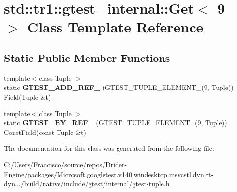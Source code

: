 \hypertarget{classstd_1_1tr1_1_1gtest__internal_1_1_get_3_019_01_4}{}\section{std\+:\+:tr1\+:\+:gtest\+\_\+internal\+:\+:Get$<$ 9 $>$ Class Template Reference}
\label{classstd_1_1tr1_1_1gtest__internal_1_1_get_3_019_01_4}
\subsection*{Static Public Member Functions}
\begin{DoxyCompactItemize}
\item 
\mbox{\label{classstd_1_1tr1_1_1gtest__internal_1_1_get_3_019_01_4_add31197dfdb381d265e221ed62129f45}} 
{\footnotesize template$<$class Tuple $>$ }\\static {\bfseries G\+T\+E\+S\+T\+\_\+\+A\+D\+D\+\_\+\+R\+E\+F\+\_\+} (G\+T\+E\+S\+T\+\_\+\+T\+U\+P\+L\+E\+\_\+\+E\+L\+E\+M\+E\+N\+T\+\_\+(9, Tuple)) Field(Tuple \&t)
\item 
\mbox{\label{classstd_1_1tr1_1_1gtest__internal_1_1_get_3_019_01_4_a5205e8da729e2bee446f5be0c65390af}} 
{\footnotesize template$<$class Tuple $>$ }\\static {\bfseries G\+T\+E\+S\+T\+\_\+\+B\+Y\+\_\+\+R\+E\+F\+\_\+} (G\+T\+E\+S\+T\+\_\+\+T\+U\+P\+L\+E\+\_\+\+E\+L\+E\+M\+E\+N\+T\+\_\+(9, Tuple)) Const\+Field(const Tuple \&t)
\end{DoxyCompactItemize}


The documentation for this class was generated from the following file\+:\begin{DoxyCompactItemize}
\item 
C\+:/\+Users/\+Francisco/source/repos/\+Drider-\/\+Engine/packages/\+Microsoft.\+googletest.\+v140.\+windesktop.\+msvcstl.\+dyn.\+rt-\/dyn.../build/native/include/gtest/internal/gtest-\/tuple.\+h\end{DoxyCompactItemize}
